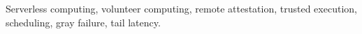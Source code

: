\documentclass[journal]{IEEEtran}
\begin{document}
\begin{IEEEkeywords}
Serverless computing, volunteer computing, remote attestation, trusted execution, scheduling, gray failure, tail latency.
\end{IEEEkeywords}















\end{document}
